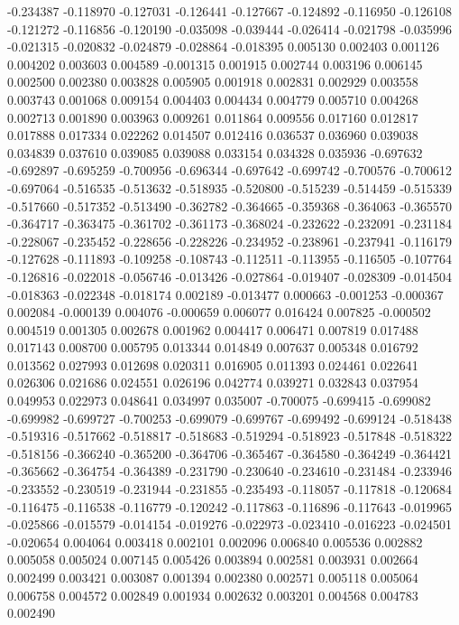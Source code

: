 -0.234387
-0.118970
-0.127031
-0.126441
-0.127667
-0.124892
-0.116950
-0.126108
-0.121272
-0.116856
-0.120190
-0.035098
-0.039444
-0.026414
-0.021798
-0.035996
-0.021315
-0.020832
-0.024879
-0.028864
-0.018395
0.005130
0.002403
0.001126
0.004202
0.003603
0.004589
-0.001315
0.001915
0.002744
0.003196
0.006145
0.002500
0.002380
0.003828
0.005905
0.001918
0.002831
0.002929
0.003558
0.003743
0.001068
0.009154
0.004403
0.004434
0.004779
0.005710
0.004268
0.002713
0.001890
0.003963
0.009261
0.011864
0.009556
0.017160
0.012817
0.017888
0.017334
0.022262
0.014507
0.012416
0.036537
0.036960
0.039038
0.034839
0.037610
0.039085
0.039088
0.033154
0.034328
0.035936
-0.697632
-0.692897
-0.695259
-0.700956
-0.696344
-0.697642
-0.699742
-0.700576
-0.700612
-0.697064
-0.516535
-0.513632
-0.518935
-0.520800
-0.515239
-0.514459
-0.515339
-0.517660
-0.517352
-0.513490
-0.362782
-0.364665
-0.359368
-0.364063
-0.365570
-0.364717
-0.363475
-0.361702
-0.361173
-0.368024
-0.232622
-0.232091
-0.231184
-0.228067
-0.235452
-0.228656
-0.228226
-0.234952
-0.238961
-0.237941
-0.116179
-0.127628
-0.111893
-0.109258
-0.108743
-0.112511
-0.113955
-0.116505
-0.107764
-0.126816
-0.022018
-0.056746
-0.013426
-0.027864
-0.019407
-0.028309
-0.014504
-0.018363
-0.022348
-0.018174
0.002189
-0.013477
0.000663
-0.001253
-0.000367
0.002084
-0.000139
0.004076
-0.000659
0.006077
0.016424
0.007825
-0.000502
0.004519
0.001305
0.002678
0.001962
0.004417
0.006471
0.007819
0.017488
0.017143
0.008700
0.005795
0.013344
0.014849
0.007637
0.005348
0.016792
0.013562
0.027993
0.012698
0.020311
0.016905
0.011393
0.024461
0.022641
0.026306
0.021686
0.024551
0.026196
0.042774
0.039271
0.032843
0.037954
0.049953
0.022973
0.048641
0.034997
0.035007
-0.700075
-0.699415
-0.699082
-0.699982
-0.699727
-0.700253
-0.699079
-0.699767
-0.699492
-0.699124
-0.518438
-0.519316
-0.517662
-0.518817
-0.518683
-0.519294
-0.518923
-0.517848
-0.518322
-0.518156
-0.366240
-0.365200
-0.364706
-0.365467
-0.364580
-0.364249
-0.364421
-0.365662
-0.364754
-0.364389
-0.231790
-0.230640
-0.234610
-0.231484
-0.233946
-0.233552
-0.230519
-0.231944
-0.231855
-0.235493
-0.118057
-0.117818
-0.120684
-0.116475
-0.116538
-0.116779
-0.120242
-0.117863
-0.116896
-0.117643
-0.019965
-0.025866
-0.015579
-0.014154
-0.019276
-0.022973
-0.023410
-0.016223
-0.024501
-0.020654
0.004064
0.003418
0.002101
0.002096
0.006840
0.005536
0.002882
0.005058
0.005024
0.007145
0.005426
0.003894
0.002581
0.003931
0.002664
0.002499
0.003421
0.003087
0.001394
0.002380
0.002571
0.005118
0.005064
0.006758
0.004572
0.002849
0.001934
0.002632
0.003201
0.004568
0.004783
0.002490
